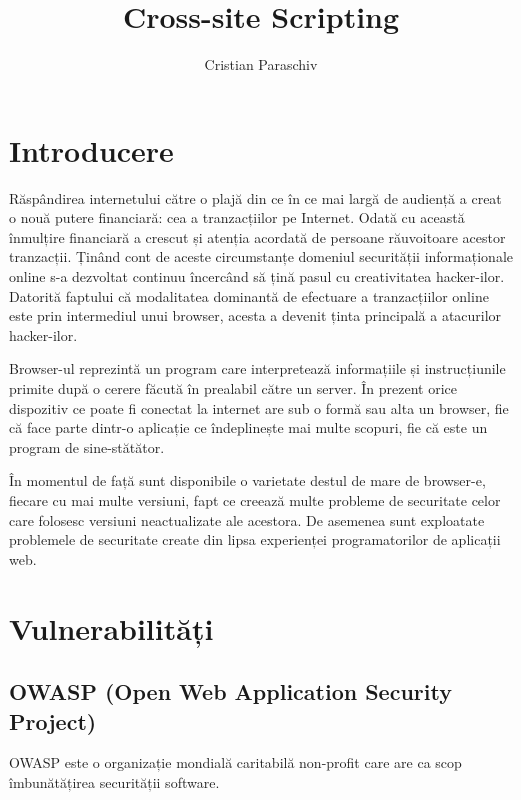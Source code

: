 \documentclass[12pt,a4paper,draft]{article}
\author{Cristian Paraschiv}
\title{Cross-site Scripting}
\begin{document}
	\section{Introducere}
	Răspândirea internetului către o plajă din ce în ce mai largă de audien\-ță a creat o nouă putere financiară: cea a tranzacțiilor pe Internet. Odată cu această înmulțire financiară a crescut și atenția acordată de persoane răuvoitoare acestor tranzacții. Ținând cont de aceste circumstanțe domeniul securității informaționale online s-a dezvoltat continuu încercând să țină pasul cu creativitatea hacker-ilor. Datorită faptului că modalitatea dominantă de efectuare a tranzacțiilor online este prin intermediul unui browser, acesta a devenit ținta principală a atacurilor hacker-ilor.
	
	Browser-ul reprezintă un program care interpretează informațiile și in\-strucțiunile primite după o cerere făcută în prealabil către un server. În prezent orice dispozitiv ce poate fi conectat la internet are sub o formă sau alta un browser, fie că face parte dintr-o aplicație ce îndeplinește mai multe scopuri, fie că este un program de sine-stătător.
	
	În momentul de față sunt disponibile o varietate destul de mare de \linebreak browser-e, fiecare cu mai multe versiuni, fapt ce creează multe probleme de securitate celor care folosesc versiuni neactualizate ale acestora. De asemenea sunt exploatate problemele de securitate create din lipsa experienței  programatorilor de aplicații web.
	
	\section{Vulnerabilități}
		\subsection{OWASP (Open Web Application Security Project)}
		OWASP este o organizație mondială caritabilă non-profit care are ca scop îmbunătățirea securității software.
	
\end{document}
